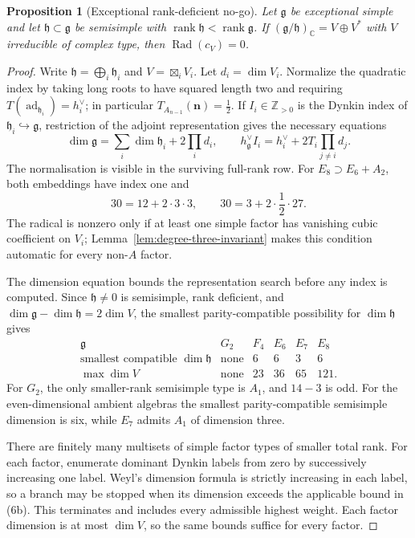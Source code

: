 \documentclass[11pt]{article}
\newtheorem{proposition}[theorem]{Proposition}
\theoremstyle{remark}
\newcommand{\g}{\mathfrak g}
\newcommand{\h}{\mathfrak h}
\newcommand{\Rad}{\operatorname{Rad}}
\begin{document}
\begin{proposition}[Exceptional rank-deficient no-go]
\label{prop:exceptional-rankdef}
Let \(\g\) be exceptional simple and let \(\h\subset\g\) be semisimple with
\(\operatorname{rank}\h<\operatorname{rank}\g\).  If
\((\g/\h)_{\mathbb C}=V\oplus V^*\) with \(V\) irreducible of complex type,
then \(\Rad(c_V)=0\).
\end{proposition}
\begin{proof}
Write \(\h=\bigoplus_i\h_i\) and
\(V=\boxtimes_i V_i\).  Let \(d_i=\dim V_i\).  Normalize the quadratic
index by taking long roots to have squared length two and requiring
\(T(\operatorname{ad}_{\h_i})=h_i^\vee\); in particular
\(T_{A_{n-1}}(\mathbf n)=\tfrac12\).  If \(I_i\in\mathbb Z_{>0}\) is the
Dynkin index of \(\h_i\hookrightarrow\g\), restriction of the adjoint
representation gives the necessary equations
\[
 \dim\g=\sum_i\dim\h_i+2\prod_i d_i,
 \qquad
 h_\g^\vee I_i=h_i^\vee+2T_i\prod_{j\ne i}d_j. \tag{6}
\]
The normalisation is visible in the surviving full-rank row.  For
\(E_8\supset E_6+A_2\), both embeddings have index one and
\[
 30=12+2\cdot3\cdot3,
 \qquad
 30=3+2\cdot\frac12\cdot27. \tag{6a}
\]
The radical is nonzero only if at least one simple factor has vanishing cubic
coefficient on \(V_i\); Lemma~\ref{lem:degree-three-invariant} makes this
condition automatic for every non-\(A\) factor.

The dimension equation bounds the representation search before any index is
computed.  Since \(\h\ne0\) is semisimple, rank deficient, and
\(\dim\g-\dim\h=2\dim V\), the smallest parity-compatible possibility for
\(\dim\h\) gives
\[
\begin{array}{c|ccccc}
 \g&G_2&F_4&E_6&E_7&E_8\\
\hline
 \text{smallest compatible }\dim\h&\text{none}&6&6&3&6\\
 \max\dim V&\text{none}&23&36&65&121.
\end{array} \tag{6b}
\]
For \(G_2\), the only smaller-rank semisimple type is \(A_1\), and
\(14-3\) is odd.  For the even-dimensional ambient algebras the smallest
parity-compatible semisimple dimension is six, while \(E_7\) admits
\(A_1\) of dimension three.

There are finitely many multisets of simple factor types of smaller total
rank. For each factor, enumerate dominant Dynkin labels from zero by
successively increasing one label. Weyl's dimension formula is strictly
increasing in each label, so a branch may be stopped when its dimension
exceeds the applicable bound in \textup{(6b)}. This terminates and includes
every admissible highest weight. Each factor dimension is at most
\(\dim V\), so the same bounds suffice for every factor.


\end{proof}
\end{document}
